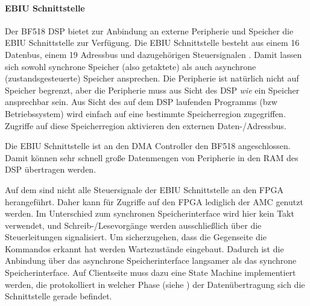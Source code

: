 
\paragraph{EBIU Schnittstelle} \label{ebiuinterface}
Der BF518 DSP bietet zur Anbindung an externe Peripherie und Speicher die \gls{EBIU} Schnittstelle zur Verfügung. Die EBIU Schnittstelle besteht aus einem \SI{16}{\bit} Datenbus, einem \SI{19}{\bit} Adressbus und dazugehörigen Steuersignalen . Damit lassen sich sowohl synchrone Speicher (also getaktete) als auch asynchrone (zustandsgesteuerte) Speicher ansprechen. Die Peripherie ist natürlich nicht auf Speicher begrenzt, aber die Peripherie muss aus Sicht des DSP \emph{wie} ein Speicher ansprechbar sein. Aus Sicht des auf dem DSP laufenden Programms (bzw Betriebssystem) wird einfach auf eine bestimmte Speicherregion zugegriffen. Zugriffe auf diese Speicherregion aktivieren den externen Daten-/Adressbus.



Die EBIU Schnittstelle ist an den \gls{DMA} Controller den BF518 angeschlossen. Damit können sehr schnell große Datenmengen von Peripherie in den RAM des DSP übertragen werden.

Auf dem \comboard sind nicht alle Steuersignale der EBIU Schnittstelle an den FPGA herangeführt. Daher kann für Zugriffe auf den FPGA lediglich der \gls{AMC} genutzt werden. Im Unterschied zum synchronen Speicherinterface wird hier kein Takt verwendet, und Schreib-/Lesevorgänge werden ausschließlich über die Steuerleitungen signalisiert. Um sicherzugehen, dass die Gegenseite die Kommandos erkannt hat werden Wartezustände eingebaut. Dadurch ist die Anbindung über das asynchrone Speicherinterface langsamer als das synchrone Speicherinterface. Auf Clientseite muss dazu eine State Machine implementiert werden, die protokolliert in welcher Phase (siehe ) der Datenübertragung sich die Schnittstelle gerade befindet.

